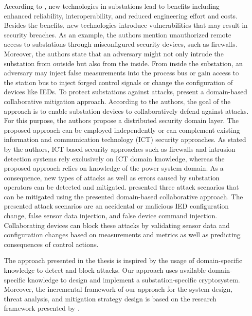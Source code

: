 According to \citeauthor{Hong2019} \cite{Hong2019}, new technologies in substations lead to benefits including enhanced reliability, interoperability, and reduced engineering effort and costs.
Besides the benefits, new technologies introduce vulnerabilities that may result in security breaches.
As an example, the authors mention unauthorized remote access to substations through misconfigured security devices, such as firewalls.
Moreover, the authors state that an adversary might not only intrude the substation from outside but also from the inside.
From inside the substation, an adversary may inject false measurements into the process bus or gain access to the station bus to inject forged control signals or change the configuration of devices like IEDs.
To protect substations against attacks, \citeauthor{Hong2019} present a domain-based collaborative mitigation approach.
According to the authors, the goal of the approach is to enable substation devices to collaboratively defend against attacks.
For this purpose, the authors propose a distributed security domain layer.
The proposed approach can be employed independently or can complement existing information and communication technology (ICT) security approaches.
As stated by the authors, ICT-based security approaches such as firewalls and intrusion detection systems rely exclusively on ICT domain knowledge, whereas the proposed approach relies on knowledge of the power system domain.
As a consequence, new types of attacks as well as errors caused by substation operators can be detected and mitigated.
\citeauthor{Hong2019} presented three attack scenarios that can be mitigated using the presented domain-based collaborative approach.
The presented attack scenarios are an accidental or malicious IED configuration change, false sensor data injection, and false device command injection.
Collaborating devices can block these attacks by validating sensor data and configuration changes based on measurements and metrics as well as predicting consequences of control actions.

The approach presented in the thesis is inspired by the usage of domain-specific knowledge to detect and block attacks.
Our approach uses available domain-specific knowledge to design and implement a substation-specific cryptosystem.
Moreover, the incremental framework of our approach for the system design, threat analysis, and mitigation strategy design is based on the research framework presented by \citeauthor{Hong2019}.

